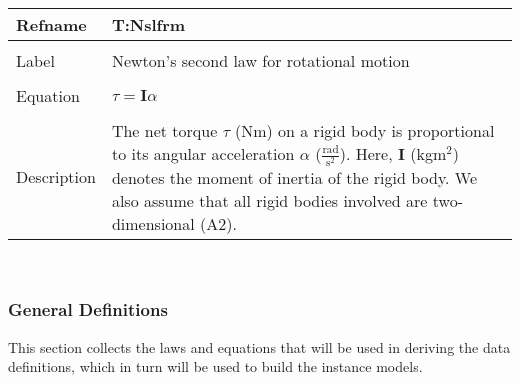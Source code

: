 \documentclass[12pt]{article}
\begin{document}
~\newline
\noindent \begin{minipage}{\textwidth}
\begin{tabular}{p{} p{}}
\toprule \textbf{Refname} & \textbf{T:Nslfrm}
\label{T:Nslfrm}
\\ \midrule \\
Label & Newton's second law for rotational motion
\\ \midrule \\
Equation & $\tau{}=\mathbf{I}\alpha{}$
\\ \midrule \\
Description & The net torque $\tau{}$ (Nm) on a rigid body is proportional to its angular acceleration $\alpha{}$ ($\frac{\text{rad}}{\text{s}^{2}}$). Here, $\mathbf{I}$ (kg$\text{m}^{2}$) denotes the moment of inertia of the rigid body. We also assume that all rigid bodies involved are two-dimensional (A2).
\\ \bottomrule \end{tabular}
\end{minipage}\\
\subsubsection{General Definitions}
\label{Sec:GDs}
This section collects the laws and equations that will be used in deriving the data definitions, which in turn will be used to build the instance models.
\end{document}
